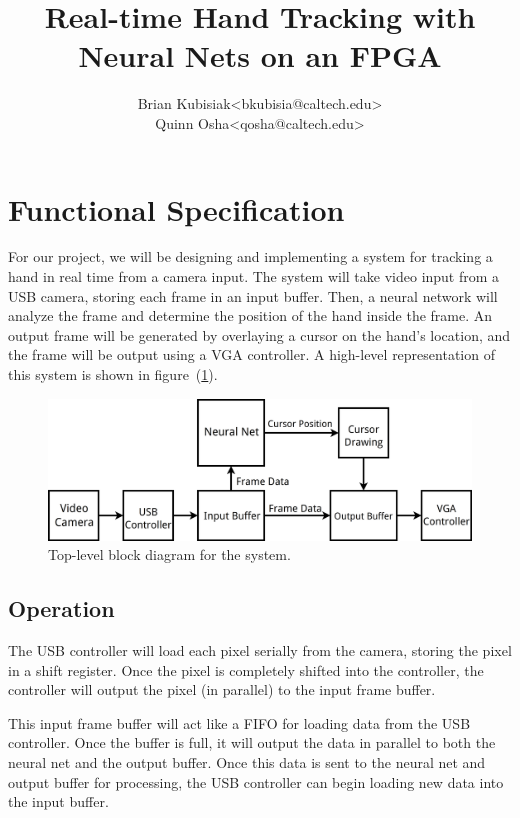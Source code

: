 \documentclass[12pt]{article}
\date{}
\title{Real-time Hand Tracking with Neural Nets on an FPGA}
\author{%
    \begin{tabular}{cc}
        Brian Kubisiak  & <bkubisia@caltech.edu> \\
        Quinn Osha      & <qosha@caltech.edu>
    \end{tabular}
}
\begin{document}
\chead{}
\rhead{\large{\today}}

\maketitle

\thispagestyle{empty}

\section{Functional Specification}
\label{sec:functional_specification}

For our project, we will be designing and implementing a system for tracking
a hand in real time from a camera input. The system will take video input from a
USB camera, storing each frame in an input buffer. Then, a neural network will
analyze the frame and determine the position of the hand inside the frame. An
output frame will be generated by overlaying a cursor on the hand's location,
and the frame will be output using a VGA controller. A high-level representation
of this system is shown in figure~(\ref{fig:top-level}).

\begin{figure}[h]
    \centering
    \vspace{12pt}
    \includegraphics[width=0.8\linewidth]{diagrams/top-level.png}
    \caption{Top-level block diagram for the system.}
\label{fig:top-level}
\end{figure}

\subsection{Operation}
\label{sub:operation}

The USB controller will load each pixel serially from the camera, storing the
pixel in a shift register. Once the pixel is completely shifted into the
controller, the controller will output the pixel (in parallel) to the input
frame buffer.

This input frame buffer will act like a FIFO for loading data from the USB
controller. Once the buffer is full, it will output the data in parallel
to both the neural net and the output buffer. Once this data is sent to the
neural net and output buffer for processing, the USB controller can begin
loading new data into the input buffer.
\end{document}
